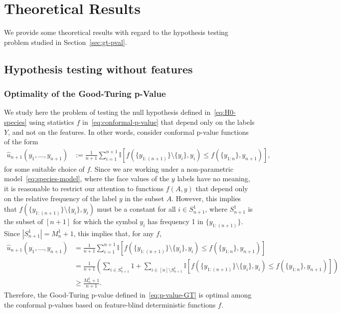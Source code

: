 \documentclass[11pt]{article}
\newcommand{\I}[1]{\mathbb{I}\left[#1\right]}
\begin{document}
\section{Theoretical Results} \label{sec:theory-good-turing-pvals}

We provide some theoretical results with regard to the hypothesis testing problem studied in Section~\ref{sec:gt-pval}.

\subsection{Hypothesis testing without features}

\subsubsection{Optimality of the Good-Turing p-Value}


We study here the problem of testing the null hypothesis defined in~\eqref{eq:H0-species} using statistics $f$ in~\eqref{eq:conformal-p-value} that depend only on the labels $Y$, and not on the features.
In other words, consider conformal p-value functions of the form
\begin{align} \label{eq:def-conf-pval-f}
  \hat{u}_{n+1}(y_1,\ldots,y_{n+1})
  & := \frac{1}{n+1} \sum_{i=1}^{n+1} \I{ f(\{y_{1:(n+1)}\} \setminus \{y_i\}, y_{i}) \leq f(\{y_{1:n}\}, y_{n+1}) },
\end{align}
for some suitable choice of $f$.
Since we are working under a non-parametric model~\eqref{eq:species-model}, where the face values of the $y$ labels have no meaning, it is reasonable to restrict our attention to functions $f(A,y)$ that depend only on the relative frequency of the label $y$ in the subset $A$. 
However, this implies that $f(\{y_{1:(n+1)}\} \setminus \{y_i\}, y_{i})$ must be a constant for all $i \in S_{n+1}^1$, where $S_{n+1}^1$ is the subset of $[n+1]$ for which the symbol $y_i$ has frequency 1 in $\{y_{1:(n+1)}\}$. Since $|S_{n+1}^1| = M_n^1 + 1$, this implies that, for any $f$,
\begin{align*}
  \hat{u}_{n+1}(y_1,\ldots,y_{n+1})
  & = \frac{1}{n+1} \sum_{i=1}^{n+1} \I{ f(\{y_{1:(n+1)}\} \setminus \{y_i\}, y_{i}) \leq f(\{y_{1:n}\}, y_{n+1}) } \\
  & = \frac{1}{n+1} \left( \sum_{i \in S_{n+1}^1} 1 + \sum_{i \in [n] \setminus S_{n+1}^1} \I{ f(\{y_{1:(n+1)}\} \setminus \{y_i\}, y_{i}) \leq f(\{y_{1:n}\}, y_{n+1}) } \right) \\
  & \geq \frac{M_n^1 + 1}{n+1}.
\end{align*}
Therefore, the Good-Turing p-value defined in~\eqref{eq:p-value-GT} is optimal among the conformal p-values based on feature-blind deterministic functions $f$.
\end{document}
